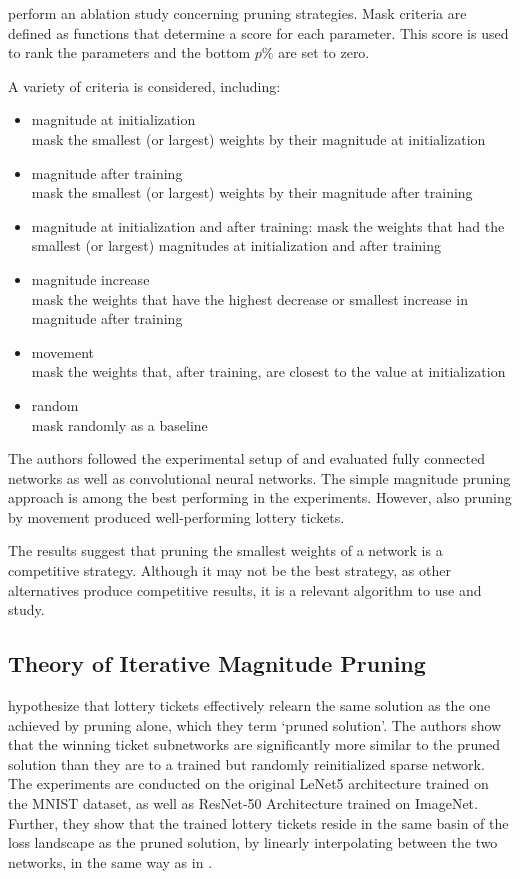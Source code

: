 \textcite{Supermasks} perform an ablation study concerning pruning strategies. Mask criteria are defined as functions that determine a score for each parameter. This score is used to rank the parameters and the bottom $p\%$ are set to zero.

A variety of criteria is considered, including: 
\begin{itemize}
\item magnitude at initialization \\
mask the smallest (or largest) weights by their magnitude at initialization
\item magnitude after training \\
mask the smallest (or largest) weights by their magnitude after training
\item magnitude at initialization and after training: mask the weights that had the smallest (or largest) magnitudes at initialization and after training
\item magnitude increase \\
mask the weights that have the highest decrease or smallest increase in magnitude after training
\item movement \\
mask the weights that, after training, are closest to the value at initialization
\item random \\
mask randomly as a baseline
\end{itemize}

The authors followed the experimental setup of \textcite{LTH} and evaluated fully connected networks as well as convolutional neural networks. The simple magnitude pruning approach is among the best performing in the experiments. However, also pruning by movement produced well-performing lottery tickets.

The results suggest that pruning the smallest weights of a network is a competitive strategy. Although it may not be the best strategy, as other alternatives produce competitive results, it is a relevant algorithm to use and study. 

\subsection{Theory of Iterative Magnitude Pruning}
\textcite{WhyLotteryTicketsWin} hypothesize that lottery tickets effectively relearn the same solution as the one achieved by pruning alone, which they term `pruned solution'.
The authors show that the winning ticket subnetworks are significantly more similar to the pruned solution than they are to a trained but randomly reinitialized sparse network.
The experiments are conducted on the original LeNet5 architecture trained on the MNIST dataset, as well as ResNet-50 Architecture trained on ImageNet. Further, they show that the trained lottery tickets reside in the same basin of the loss landscape as the pruned solution, by linearly interpolating between the two networks, in the same way as in \autocite{LinearModeConnectivity}.

